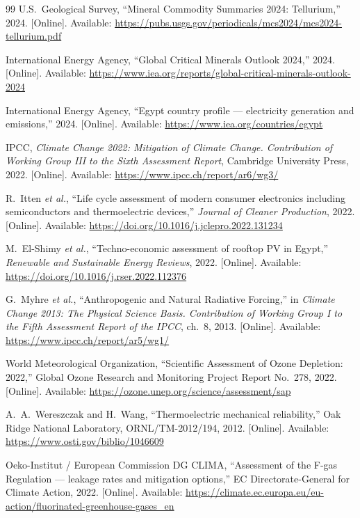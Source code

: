\documentclass[11pt,a4paper]{article}
\begin{document}
\begin{thebibliography}{99}
U.S.~Geological Survey, ``Mineral Commodity Summaries 2024: Tellurium,'' 2024. [Online]. Available: \url{https://pubs.usgs.gov/periodicals/mcs2024/mcs2024-tellurium.pdf}

International Energy Agency, ``Global Critical Minerals Outlook 2024,'' 2024. [Online]. Available: \url{https://www.iea.org/reports/global-critical-minerals-outlook-2024}

International Energy Agency, ``Egypt country profile --- electricity generation and emissions,'' 2024. [Online]. Available: \url{https://www.iea.org/countries/egypt}

IPCC, \emph{Climate Change 2022: Mitigation of Climate Change. Contribution of Working Group III to the Sixth Assessment Report}, Cambridge University Press, 2022. [Online]. Available: \url{https://www.ipcc.ch/report/ar6/wg3/}

R.~Itten \emph{et al.}, ``Life cycle assessment of modern consumer electronics including semiconductors and thermoelectric devices,'' \emph{Journal of Cleaner Production}, 2022. [Online]. Available: \url{https://doi.org/10.1016/j.jclepro.2022.131234}

M.~El-Shimy \emph{et al.}, ``Techno-economic assessment of rooftop PV in Egypt,'' \emph{Renewable and Sustainable Energy Reviews}, 2022. [Online]. Available: \url{https://doi.org/10.1016/j.rser.2022.112376}

G.~Myhre \emph{et al.}, ``Anthropogenic and Natural Radiative Forcing,'' in \emph{Climate Change 2013: The Physical Science Basis. Contribution of Working Group I to the Fifth Assessment Report of the IPCC}, ch.~8, 2013. [Online]. Available: \url{https://www.ipcc.ch/report/ar5/wg1/}

World Meteorological Organization, ``Scientific Assessment of Ozone Depletion: 2022,'' Global Ozone Research and Monitoring Project Report No.~278, 2022. [Online]. Available: \url{https://ozone.unep.org/science/assessment/sap}

A.~A.~Wereszczak and H.~Wang, ``Thermoelectric mechanical reliability,'' Oak Ridge National Laboratory, ORNL/TM-2012/194, 2012. [Online]. Available: \url{https://www.osti.gov/biblio/1046609}

Oeko-Institut / European Commission DG CLIMA, ``Assessment of the F-gas Regulation --- leakage rates and mitigation options,'' EC Directorate-General for Climate Action, 2022. [Online]. Available: \url{https://climate.ec.europa.eu/eu-action/fluorinated-greenhouse-gases_en}


\end{thebibliography}
\end{document}
